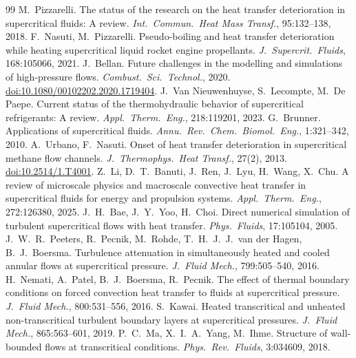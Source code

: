 \documentclass[11pt]{article}
\begin{document}
\begin{thebibliography}{99}\small
{} M.\ Pizzarelli. The status of the research on the heat transfer deterioration in supercritical fluids: A review. \emph{Int.\ Commun.\ Heat Mass Transf.}, 95:132--138, 2018.
 F.\ Nasuti, M.\ Pizzarelli. Pseudo-boiling and heat transfer deterioration while heating supercritical liquid rocket engine propellants. \emph{J.\ Supercrit.\ Fluids}, 168:105066, 2021.
 J.\ Bellan. Future challenges in the modelling and simulations of high-pressure flows. \emph{Combust.\ Sci.\ Technol.}, 2020. \href{https://doi.org/10.1080/00102202.2020.1719404}{doi:10.1080/00102202.2020.1719404}.
 J.\ Van Nieuwenhuyse, S.\ Lecompte, M.\ De Paepe. Current status of the thermohydraulic behavior of supercritical refrigerants: A review. \emph{Appl.\ Therm.\ Eng.}, 218:119201, 2023.
 G.\ Brunner. Applications of supercritical fluids. \emph{Annu.\ Rev.\ Chem.\ Biomol.\ Eng.}, 1:321--342, 2010.
 A.\ Urbano, F.\ Nasuti. Onset of heat transfer deterioration in supercritical methane flow channels. \emph{J.\ Thermophys.\ Heat Transf.}, 27(2), 2013. \href{https://doi.org/10.2514/1.T4001}{doi:10.2514/1.T4001}.
 Z.\ Li, D.\ T.\ Banuti, J.\ Ren, J.\ Lyu, H.\ Wang, X.\ Chu. A review of microscale physics and macroscale convective heat transfer in supercritical fluids for energy and propulsion systems. \emph{Appl.\ Therm.\ Eng.}, 272:126380, 2025.
 J.\ H.\ Bae, J.\ Y.\ Yoo, H.\ Choi. Direct numerical simulation of turbulent supercritical flows with heat transfer. \emph{Phys.\ Fluids}, 17:105104, 2005.
 J.\ W.\ R.\ Peeters, R.\ Pecnik, M.\ Rohde, T.\ H.\ J.\ J.\ van der Hagen, B.\ J.\ Boersma. Turbulence attenuation in simultaneously heated and cooled annular flows at supercritical pressure. \emph{J.\ Fluid Mech.}, 799:505--540, 2016.
 H.\ Nemati, A.\ Patel, B.\ J.\ Boersma, R.\ Pecnik. The effect of thermal boundary conditions on forced convection heat transfer to fluids at supercritical pressure. \emph{J.\ Fluid Mech.}, 800:531--556, 2016.
 S.\ Kawai. Heated transcritical and unheated non-transcritical turbulent boundary layers at supercritical pressures. \emph{J.\ Fluid Mech.}, 865:563--601, 2019.
 P.\ C.\ Ma, X.\ I.\ A.\ Yang, M.\ Ihme. Structure of wall-bounded flows at transcritical conditions. \emph{Phys.\ Rev.\ Fluids}, 3:034609, 2018.

\end{thebibliography}
\end{document}
